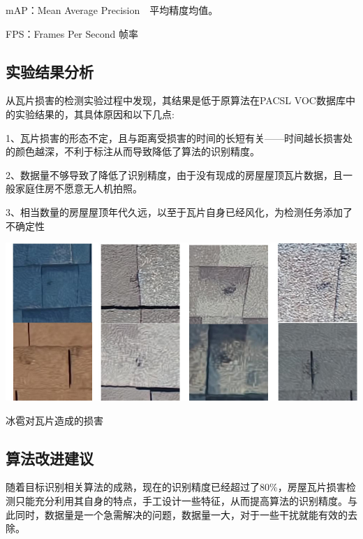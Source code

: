 mAP：Mean Average Precision　平均精度均值。

FPS：Frames Per Second 帧率
\subsection{实验结果分析}
从瓦片损害的检测实验过程中发现，其结果是低于原算法在PACSL VOC数据库中的实验结果的，其具体原因和以下几点:

1、瓦片损害的形态不定，且与距离受损害的时间的长短有关——时间越长损害处的颜色越深，不利于标注从而导致降低了算法的识别精度。

2、数据量不够导致了降低了识别精度，由于没有现成的房屋屋顶瓦片数据，且一般家庭住房不愿意无人机拍照。

3、相当数量的房屋屋顶年代久远，以至于瓦片自身已经风化，为检测任务添加了不确定性
\begin{uscfigure}
	\includegraphics[width=\textwidth]{./Pictures/damage.jpg}	
	\caption{冰雹对瓦片造成的损害}
	\label{damage}
\end{uscfigure}
\subsection{算法改进建议}
随着目标识别相关算法的成熟，现在的识别精度已经超过了80\%，房屋瓦片损害检测只能充分利用其自身的特点，手工设计一些特征，从而提高算法的识别精度。与此同时，数据量是一个急需解决的问题，数据量一大，对于一些干扰就能有效的去除。
